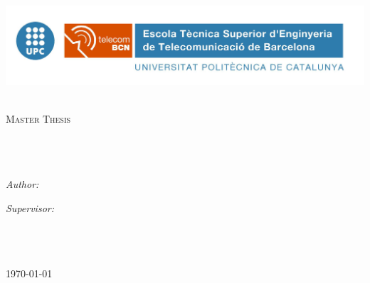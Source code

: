 \documentclass[11pt, oneside]{Thesis} %
\begin{document}
\begin{titlepage}
\includegraphics[width=410pt]{ETSETB.jpg}
\begin{center}

\textsc{\LARGE \univname}\\[1.5cm] %
\textsc{\Large Master Thesis}\\[0.5cm] %

\HRule \\[0.4cm] %
{\huge \bfseries \ttitle}\\[0.4cm] %
\HRule \\[1.5cm] %
 
\begin{minipage}{0.4\textwidth}
\begin{flushleft} \large
\emph{Author:}\\
{\authornames} %
\end{flushleft}
\end{minipage}
\begin{minipage}{0.4\textwidth}
\begin{flushright} \large
\emph{Supervisor:} \\
{\supname} %
\end{flushright}
\end{minipage}\\[6cm]

\groupname\\\deptname\\[2cm] %
 
{\large \today}\\[4cm] %
 
\vfill
\end{center}

\end{titlepage}
\end{document}
